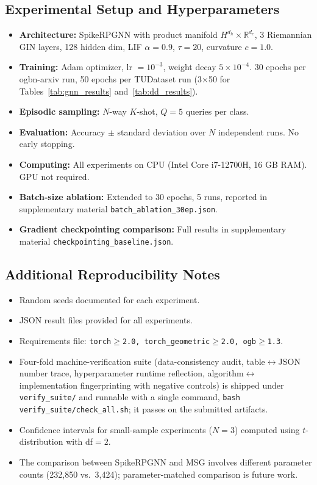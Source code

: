 \documentclass[a4paper,fleqn]{cas-dc}
\begin{document}
\subsection*{Experimental Setup and Hyperparameters}

\begin{itemize}
    \item \textbf{Architecture:} SpikeRPGNN with product manifold $H^{d_h}{\times}\mathbb{R}^{d_e}$, 3 Riemannian GIN layers, 128 hidden dim, LIF $\alpha{=}0.9$, $\tau{=}20$, curvature $c{=}1.0$.
    \item \textbf{Training:} Adam optimizer, lr $=10^{-3}$, weight decay $5\times10^{-4}$. 30 epochs per ogbn-arxiv run, 50 epochs per TUDataset run (3$\times$50 for Tables~\ref{tab:gnn_results} and~\ref{tab:dd_results}).
    \item \textbf{Episodic sampling:} $N$-way $K$-shot, $Q{=}5$ queries per class.
    \item \textbf{Evaluation:} Accuracy $\pm$ standard deviation over $N$ independent runs. No early stopping.
    \item \textbf{Computing:} All experiments on CPU (Intel Core i7-12700H, 16 GB RAM). GPU not required.
    \item \textbf{Batch-size ablation:} Extended to 30 epochs, 5 runs, reported in supplementary material \texttt{batch\_ablation\_30ep.json}.
    \item \textbf{Gradient checkpointing comparison:} Full results in supplementary material \texttt{checkpointing\_baseline.json}.
\end{itemize}

\subsection*{Additional Reproducibility Notes}

\begin{itemize}
    \item[\checkmark] Random seeds documented for each experiment.
    \item[\checkmark] JSON result files provided for all experiments.
    \item[\checkmark] Requirements file: \texttt{torch$\ge$2.0, torch\_geometric$\ge$2.0, ogb$\ge$1.3}.
    \item[\checkmark] Four-fold machine-verification suite (data-consistency audit, table$\leftrightarrow$JSON number trace, hyperparameter runtime reflection, algorithm$\leftrightarrow$implementation fingerprinting with negative controls) is shipped under \texttt{verify\_suite/} and runnable with a single command, \texttt{bash verify\_suite/check\_all.sh}; it passes on the submitted artifacts.
    \item[-] Confidence intervals for small-sample experiments ($N{=}3$) computed using $t$-distribution with df${=}2$.
    \item[-] The comparison between SpikeRPGNN and MSG involves different parameter counts (232,850 vs.\ 3,424); parameter-matched comparison is future work.
\end{itemize}
\end{document}
